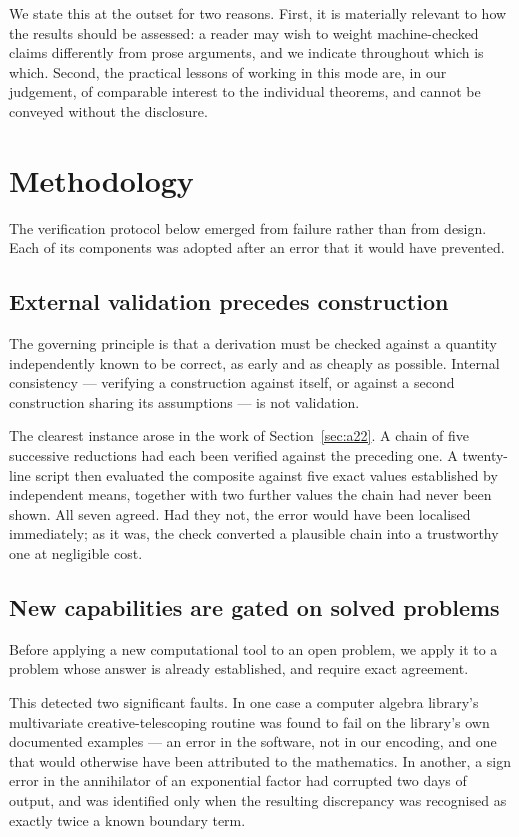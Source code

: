 \documentclass[11pt]{article}
\theoremstyle{definition}
\begin{document}
We state this at the outset for two reasons. First, it is materially relevant
to how the results should be assessed: a reader may wish to weight
machine-checked claims differently from prose arguments, and we indicate
throughout which is which. Second, the practical lessons of working in this
mode are, in our judgement, of comparable interest to the individual theorems,
and cannot be conveyed without the disclosure.

\section{Methodology}\label{sec:method}

The verification protocol below emerged from failure rather than from design.
Each of its components was adopted after an error that it would have
prevented.

\subsection{External validation precedes construction}

The governing principle is that a derivation must be checked against a quantity
independently known to be correct, as early and as cheaply as possible.
Internal consistency --- verifying a construction against itself, or against a
second construction sharing its assumptions --- is not validation.

The clearest instance arose in the work of Section~\ref{sec:a22}. A chain of
five successive reductions had each been verified against the preceding one. A
twenty-line script then evaluated the composite against five exact values
established by independent means, together with two further values the chain
had never been shown. All seven agreed. Had they not, the error would have been
localised immediately; as it was, the check converted a plausible chain into a
trustworthy one at negligible cost.

\subsection{New capabilities are gated on solved problems}

Before applying a new computational tool to an open problem, we apply it to a
problem whose answer is already established, and require exact agreement.

This detected two significant faults. In one case a computer algebra library's
multivariate creative-telescoping routine was found to fail on the library's
own documented examples --- an error in the software, not in our encoding, and
one that would otherwise have been attributed to the mathematics. In another, a
sign error in the annihilator of an exponential factor had corrupted two days
of output, and was identified only when the resulting discrepancy was
recognised as exactly twice a known boundary term.
\end{document}
